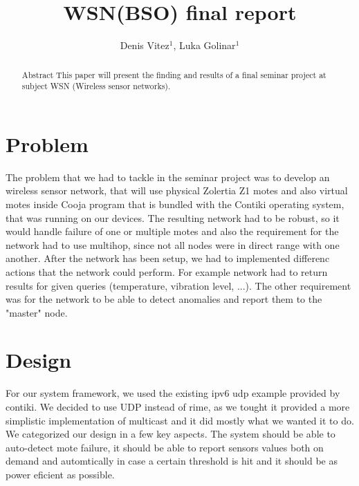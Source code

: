 \documentclass[a4paper]{article}
\begin{document}
\title{WSN(BSO) final report}

\author{Denis Vitez$^{1}$, Luka Golinar$^{1}$} %



\maketitle


\begin{abstract}{Abstract}
This paper will present the finding and results of a final seminar project at subject WSN (Wireless sensor networks).
\end{abstract}



\section{Problem}
The problem that we had to tackle in the seminar project was to develop an wireless sensor network, that will use physical Zolertia Z1 motes and also virtual motes inside Cooja program that is bundled with the Contiki operating system, that was running on our devices. The resulting network had to be robust, so it would handle failure of one or multiple motes and also the requirement for the network had to use multihop, since not all nodes were in direct range with one another. After the network has been setup, we had to implemented differenc actions that the network could perform. For example network had to return results for given queries (temperature, vibration level, ...). The other requirement was for the network to be able to detect anomalies and report them to the "master" node.
\section{Design}
For our system framework, we used the existing ipv6 udp example provided by contiki. We decided to use UDP instead of rime, as we tought it provided a more simplistic implementation of multicast and it did mostly what we wanted it to do. We categorized our design in a few key aspects. The system should be able to auto-detect mote failure, it should be able to report sensors values both on demand and automtically in case a certain threshold is hit and it should be as power eficient as possible.
\end{document}
